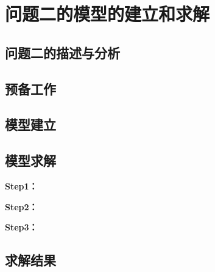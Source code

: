 \section{问题二的模型的建立和求解}
\subsection{问题二的描述与分析}

\subsection{预备工作}

\subsection{模型建立}

\subsection{模型求解}

\textbf{Step1：} 

\textbf{Step2：} 

\textbf{Step3：} 

\subsection{求解结果}